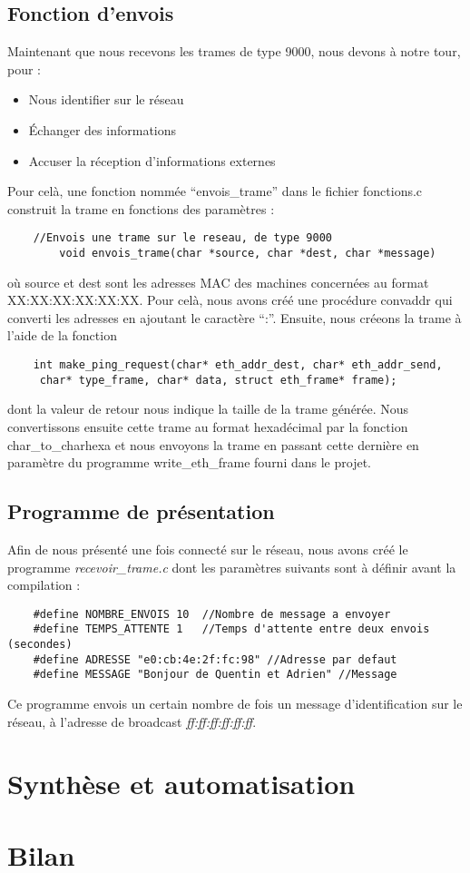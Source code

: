 \documentclass[a4paper,11pt]{article}
\begin{document}
	\subsection{Fonction d'envois}
	Maintenant que nous recevons les trames de type 9000, nous devons à notre tour, pour :
	\begin{itemize}
	\item Nous identifier sur le réseau
	\item Échanger des informations
	\item Accuser la réception d'informations externes
	\end{itemize}
	Pour celà, une fonction nommée ``envois\_trame'' dans le fichier fonctions.c construit la trame en fonctions des paramètres :
	\begin{lstlisting}
	//Envois une trame sur le reseau, de type 9000
        void envois_trame(char *source, char *dest, char *message)
	\end{lstlisting}
	où source et dest sont les adresses MAC des machines concernées au format XX:XX:XX:XX:XX:XX. Pour celà, nous avons créé une procédure convaddr qui converti les adresses en ajoutant le caractère \enquote{:}. Ensuite, nous créeons la trame à l'aide de la fonction
	\begin{lstlisting}
	int make_ping_request(char* eth_addr_dest, char* eth_addr_send,
	 char* type_frame, char* data, struct eth_frame* frame);
	\end{lstlisting}
	dont la valeur de retour nous indique la taille de la trame générée. Nous convertissons ensuite cette trame au format hexadécimal par la fonction char\_to\_charhexa et nous envoyons la trame en passant cette dernière en paramètre du programme write\_eth\_frame fourni dans le projet.
	\subsection{Programme de présentation}
	Afin de nous présenté une fois connecté sur le réseau, nous avons créé le programme \textit{recevoir\_trame.c} dont les paramètres suivants sont à définir avant la compilation :
	\begin{lstlisting}
	#define NOMBRE_ENVOIS 10  //Nombre de message a envoyer
	#define TEMPS_ATTENTE 1	  //Temps d'attente entre deux envois (secondes)
	#define ADRESSE "e0:cb:4e:2f:fc:98" //Adresse par defaut
	#define MESSAGE "Bonjour de Quentin et Adrien" //Message
	\end{lstlisting}
	Ce programme envois un certain nombre de fois un message d'identification sur le réseau, à l'adresse de broadcast \textit{ff:ff:ff:ff:ff:ff}.
	\section{Synthèse et automatisation}
	\section{Bilan}
\end{document}
